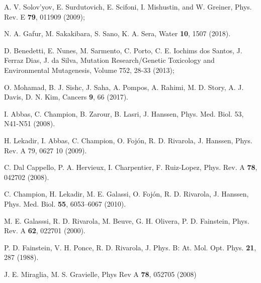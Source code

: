 \begin{thebibliography}{9}
A. V. Solov'yov, E. Surdutovich, E. Scifoni, I. Mishustin, and 
W. Greiner, 
Phys. Rev. E \textbf{79}, 011909 (2009);

N. A. Gafur, M.  Sakakibara, S. Sano, K. A. Sera, 
Water \textbf{10}, 1507 (2018).

D. Benedetti, E. Nunes, M. Sarmento, C. Porto, C. E. Iochims dos Santos, 
J. Ferraz Dias, J. da Silva,
Mutation Research/Genetic Toxicology and Environmental Mutagenesis,
Volume 752, 28-33 (2013);

O. Mohamad, B. J. Sishc, J. Saha, A. Pompos, A. Rahimi, M. D. Story, 
A. J. Davis, D. N. Kim, 
Cancers \textbf{9}, 66 (2017).


I. Abbas, C. Champion, B. Zarour, B. Lasri, J. Hanssen,
Phys. Med. Biol. 53, N41-N51 (2008).

H. Lekadir, I. Abbas, C. Champion, O. Fojón, R. D. Rivarola, J. Hanssen,
Phys. Rev. A 79, 0627 10 (2009).

C. Dal Cappello, P. A. Hervieux, I. Charpentier, F. Ruiz-Lopez,
Phys. Rev. A \textbf{78}, 042702 (2008).

C. Champion, H. Lekadir, M. E. Galassi, O. Fojón, R. D. Rivarola, 
J. Hanssen,
Phys. Med. Biol. \textbf{55}, 6053--6067 (2010).

M. E. Galasssi, R. D. Rivarola, M. Beuve, G. H. Olivera, P. D. Fainstein, 
Phys. Rev. A \textbf{62}, 022701 (2000).

P. D. Fainstein, V. H. Ponce, R. D. Rivarola,
J. Phys. B: At. Mol. Opt. Phys. \textbf{21}, 287 (1988).

J. E. Miraglia, M. S. Gravielle,
Phys Rev A \textbf{78}, 052705 (2008)


\end{thebibliography}
